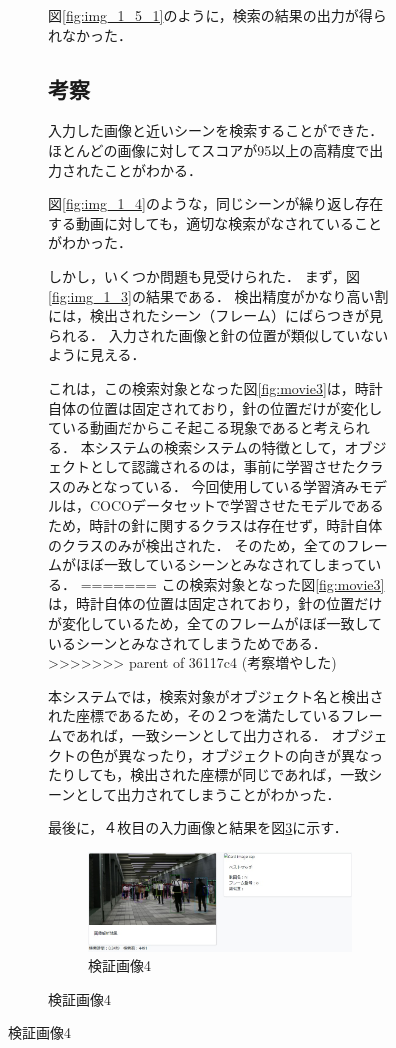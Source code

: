 \documentclass[a4j,12pt,dvipdfmx]{jreport}
\begin{document}
\begin{figure}[H]
\begin{figure}[H]
図\ref{fig:img_1_5_1}のように，検索の結果の出力が得られなかった．

\subsection{考察}
入力した画像と近いシーンを検索することができた．
ほとんどの画像に対してスコアが95以上の高精度で出力されたことがわかる．

図\ref{fig:img_1_4}のような，同じシーンが繰り返し存在する動画に対しても，適切な検索がなされていることがわかった．

しかし，いくつか問題も見受けられた．
まず，図\ref{fig:img_1_3}の結果である．
検出精度がかなり高い割には，検出されたシーン（フレーム）にばらつきが見られる．
入力された画像と針の位置が類似していないように見える．

これは，この検索対象となった図\ref{fig:movie3}は，時計自体の位置は固定されており，針の位置だけが変化している動画だからこそ起こる現象であると考えられる．
本システムの検索システムの特徴として，オブジェクトとして認識されるのは，事前に学習させたクラスのみとなっている．
今回使用している学習済みモデルは，COCOデータセットで学習させたモデルであるため，時計の針に関するクラスは存在せず，時計自体のクラスのみが検出された．
そのため，全てのフレームがほぼ一致しているシーンとみなされてしまっている．
=======
この検索対象となった図\ref{fig:movie3}は，時計自体の位置は固定されており，針の位置だけが変化しているため，全てのフレームがほぼ一致しているシーンとみなされてしまうためである．
>>>>>>> parent of 36117c4 (考察増やした)

本システムでは，検索対象がオブジェクト名と検出された座標であるため，その２つを満たしているフレームであれば，一致シーンとして出力される．
オブジェクトの色が異なったり，オブジェクトの向きが異なったりしても，検出された座標が同じであれば，一致シーンとして出力されてしまうことがわかった．

最後に，４枚目の入力画像と結果を図\ref{fig:img_1-4}に示す．
\begin{figure}[b]
  \centering
  \includegraphics[width=13cm]{image/result_1_4.jpg}
  \caption{検証画像4}
  \label{fig:img_1-4}
\end{figure}


\end{figure}
\end{figure}
\end{document}
